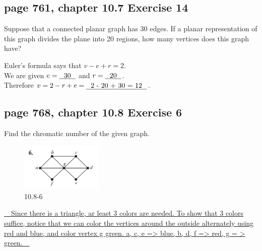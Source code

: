 \documentclass[sigconf]{acmart}
\begin{document}
\subsection{page 761, chapter 10.7 Exercise 14}
\begin{shaded}
    Suppose that a connected planar graph has 30 edges. If a planar representation of this graph divides the plane into 20 regions, how many vertices does this graph have?
\end{shaded}
Euler's formula says that $v - e + r = 2$.\\
We are given $e = \uline{\text{~~30~~}}$ and $r = \uline{\text{~~20~~}}$. \\
Therefore $v = 2 - r + e = \uline{\text{~~2 - 20 + 30 = 12~~}}$.

\clearpage

\subsection{page 768, chapter 10.8 Exercise 6}
\begin{shaded}
    Find the chromatic number of the given graph.
\end{shaded}
\begin{figure}[h]
    \centering
    \includegraphics[width=0.35\textwidth]{10.8-6.png}
    \caption{10.8-6}
    \label{fig:d}
\end{figure}
\uline{~~Since there is a triangle, ar least 3 colors are needed. To show that 3 colors suffice, notice that we can color the vertices around the outside alternately using red and blue, and color vertex g green. a, c, e => blue, b, d, f => red, g = > green.~~}

\vspace{15cm}
\end{document}

